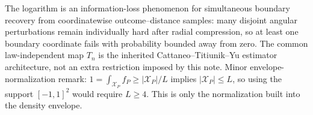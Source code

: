 The logarithm is an information-loss phenomenon for simultaneous boundary recovery from coordinatewise outcome--distance samples: many disjoint angular perturbations remain individually hard after radial compression, so at least one boundary coordinate fails with probability bounded away from zero.  The common law-independent map \(T_n\) is the inherited Cattaneo--Titiunik--Yu estimator architecture, not an extra restriction imposed by this note.  Minor envelope-normalization remark: \(1=\int_{\mathcal X_P}f_P\geq|\mathcal X_P|/L\) implies \(|\mathcal X_P|\leq L\), so using the support \([-1,1]^2\) would require \(L\geq4\).  This is only the normalization built into the density envelope.